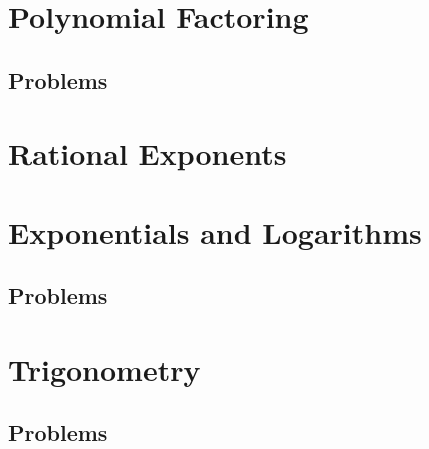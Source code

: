 \documentclass{scrbook}
\theoremstyle{definition}
\begin{document}
\section{Polynomial Factoring}

\subsection{Problems}

\section{Rational Exponents}

\section{Exponentials and Logarithms}

\subsection{Problems}

\section{Trigonometry}

\subsection{Problems}

\printbibliography
\end{document}
